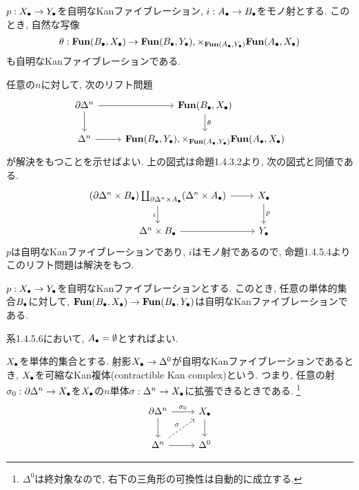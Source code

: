 \documentclass[uplatex, a4paper, 14Q, dvipdfmx]{jsreport}
\begin{document}
\begin{cor}
  $p: X_\bullet \to Y_\bullet$を自明なKanファイブレーション, $i: A_\bullet \to B_\bullet$をモノ射とする. 
  このとき, 自然な写像
  \begin{align*}
    \theta: \mathbf{Fun}(B_\bullet,X_\bullet) \to \mathbf{Fun}(B_\bullet,Y_\bullet), \times_{\mathbf{Fun}(A_\bullet,Y_\bullet)} \mathbf{Fun}(A_\bullet,X_\bullet)
  \end{align*}
  も自明なKanファイブレーションである.
\end{cor}

\begin{Proof}
  任意の$n$に対して, 次のリフト問題
  \[\begin{tikzcd}
    {\del \Delta^n} & {\fun(\B,\X)} \\
    {\Delta^n} & {\fun(\B,\Y), \ti_{\fun(\A,\Y)} \fun(\A,\X)}
    \arrow[from=1-1, to=2-1]
    \arrow[from=1-1, to=1-2]
    \arrow["\theta", from=1-2, to=2-2]
    \arrow[from=2-1, to=2-2]
  \end{tikzcd}\]
  が解決をもつことを示せばよい. 
  上の図式は命題1.4.3.2より, 次の図式と同値である. 
  \[\begin{tikzcd}
    {(\del \Delta^n \ti \B) \coprod_{\del \Delta^n \ti \A} (\Delta^n \ti \A)} & \X \\
    {\Delta^n \ti\B} & \Y
    \arrow["i"', from=1-1, to=2-1]
    \arrow[from=1-1, to=1-2]
    \arrow["p", from=1-2, to=2-2]
    \arrow[from=2-1, to=2-2]
  \end{tikzcd}\]
  $p$は自明なKanファイブレーションであり, $i$はモノ射であるので, 命題1.4.5.4よりこのリフト問題は解決をもつ. 
\end{Proof}

\begin{cor}
  $p: X_\bullet \to Y_\bullet$を自明なKanファイブレーションとする.
  このとき, 任意の単体的集合$B_\bullet$に対して, $\mathbf{Fun}(B_\bullet,X_\bullet) \to \mathbf{Fun}(B_\bullet,Y_\bullet)$は自明なKanファイブレーションである.
\end{cor}

\begin{Proof}
  系1.4.5.6において, $A_\bullet = \emptyset$とすればよい. 
\end{Proof}

\begin{definition}
  $X_\bullet$を単体的集合とする. 
  射影$X_\bullet \to \Delta^0$が自明なKanファイブレーションであるとき, $X_\bullet$を可縮なKan複体(contractible Kan complex)という.
  つまり, 任意の射$\sigma_0: \partial \Delta^n \to X_\bullet$を$X_\bullet$の$n$単体$\sigma: \Delta^n \to X_\bullet$に拡張できるときである. 
  \footnote{
    $\Delta^0$は終対象なので, 右下の三角形の可換性は自動的に成立する. 
  }
  \[\begin{tikzcd}
    {\del \Delta^n} & \X \\
    {\Delta^n} & {\Delta^0}
    \arrow[from=1-2, to=2-2]
    \arrow[from=2-1, to=2-2]
    \arrow[from=1-1, to=2-1]
    \arrow["{\si_0}", from=1-1, to=1-2]
    \arrow["\si", dashed, from=2-1, to=1-2]
  \end{tikzcd}\]
\end{definition}
\end{document}

